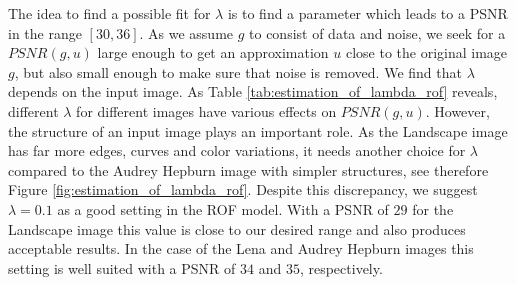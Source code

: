 \documentclass[abstracton]{scrreprt}
\begin{document}
            The idea to find a possible fit for $\lambda$ is to find a parameter which leads to a PSNR in the range $[30, 36]$. As we assume $g$ to consist of data and noise, we seek for a $PSNR(g, u)$ large enough to get an approximation $u$ close to the original image $g$, but also small enough to make sure that noise is removed. We find that $\lambda$ depends on the input image. As Table \ref{tab:estimation_of_lambda_rof} reveals, different $\lambda$ for different images have various effects on $PSNR(g, u)$. However, the structure of an input image plays an important role. As the Landscape image has far more edges, curves and color variations, it needs another choice for $\lambda$ compared to the Audrey Hepburn image with simpler structures, see therefore Figure \ref{fig:estimation_of_lambda_rof}. Despite this discrepancy, we suggest $\lambda = 0.1$ as a good setting in the ROF model. With a PSNR of $29$ for the Landscape image this value is close to our desired range and also produces acceptable results. In the case of the Lena and Audrey Hepburn images this setting is well suited with a PSNR of $34$ and $35$, respectively.
\end{document}
